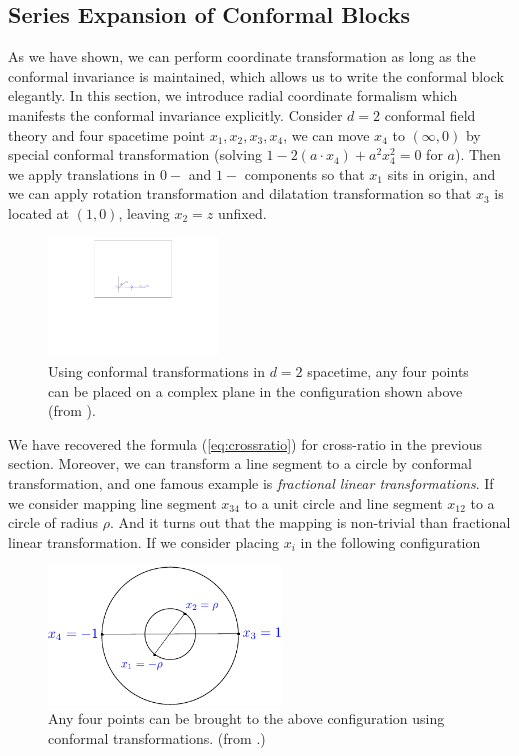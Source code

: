 \documentclass[12pt]{article}
\numberwithin{equation}{section}
\newcommand\<\langle
\renewcommand\>\rangle
\renewcommand\.{\cdot}
\begin{document}
\subsection{Series Expansion of Conformal Blocks}
As we have shown, we can perform coordinate transformation as long as the conformal invariance is maintained, which allows us to write the conformal block elegantly. In this section, we introduce radial coordinate formalism \cite{Hogervorst_2013} which manifests the conformal invariance explicitly.
Consider $d=2$ conformal field theory and four spacetime point $x_1,x_2,x_3,x_4$, we can move $x_4$ to $(\infty,0)$ by special conformal transformation (solving $1-2(a\cdot x_4)+a^2x_4^2 = 0$ for $a$). Then we apply translations in $0-$ and $1-$ components so that $x_1$ sits in origin, and we can apply rotation transformation and dilatation transformation so that $x_3$ is located at $(1,0)$, leaving $x_2 = z$ unfixed. 
\begin{figure}[H]
\begin{center}
\includegraphics[width=0.4\textwidth]{fig-z}
\end{center}
\caption{\label{fig:zplane} Using conformal transformations in $d=2$ spacetime, any four points can be placed on a complex plane in the configuration shown above (from \cite{Hogervorst_2013}).}
\end{figure}
We have recovered the formula (\ref{eq:crossratio}) for cross-ratio in the previous section. Moreover, we can transform a line segment to a circle by conformal transformation, and one famous example is \textit{fractional linear transformations}. If we consider mapping line segment $x_{34}$ to a unit circle and line segment $x_{12}$ to a circle of radius $\rho$. And it turns out that the mapping is non-trivial than fractional linear transformation. If we consider placing $x_{i}$ in the following configuration
\begin{figure}[h]
\begin{center}
\includegraphics[width=0.55\textwidth]{fig-rho}
\end{center}
\caption{Any four points can be brought to the above configuration using conformal transformations. (from \cite{Hogervorst_2013}.)  \label{fig:rho}}
\end{figure}
\end{document}
